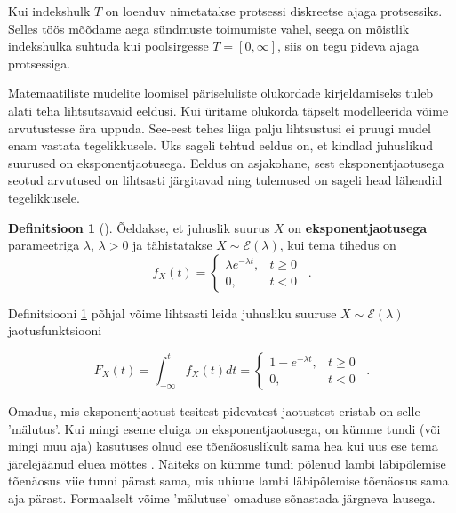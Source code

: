 \documentclass{article}
\theoremstyle{definition}
\newtheorem{definition}{Definitsioon}
\begin{document}
Kui indekshulk $T$ on loenduv nimetatakse protsessi diskreetse ajaga protsessiks. Selles töös mõõdame aega sündmuste toimumiste vahel, seega on mõistlik indekshulka suhtuda kui poolsirgesse $T= [0, \infty]$, siis on tegu pideva ajaga protsessiga.

Matemaatiliste mudelite loomisel päriseluliste olukordade kirjeldamiseks tuleb alati teha lihtsutsavaid eeldusi. Kui üritame olukorda täpselt modelleerida võime arvutustesse ära uppuda. See-eest tehes liiga palju lihtsustusi ei pruugi mudel enam vastata tegelikkusele. Üks sageli tehtud eeldus on, et kindlad juhuslikud suurused on eksponentjaotusega. Eeldus on asjakohane, sest eksponentjaotusega seotud arvutused on lihtsasti järgitavad ning tulemused on sageli head lähendid tegelikkusele. \cite[lk 291]{introduction-to-probability-models}

\begin{definition}[\cite{tõenäosusteooria-algkursus}]
    \label{def:eksponentjaotus}
    Õeldakse, et juhuslik suurus $X$ on \textbf{eksponentjaotusega} parameetriga $\lambda$, $\lambda > 0$ ja tähistatakse $X \sim \mathcal{E}(\lambda)$, kui tema tihedus on
    \begin{equation*}
        f_X(t) = 
        \begin{cases}
            \lambda e^{- \lambda t} ,   &t \geq 0 \\
            0 ,                         &t < 0
        \end{cases}
        \enspace .
    \end{equation*}
\end{definition}

Definitsiooni \ref{def:eksponentjaotus} põhjal võime lihtsasti leida juhusliku suuruse $X \sim \mathcal{E}(\lambda)$ jaotusfunktsiooni

\begin{equation*}
    F_X(t) = \int_{- \infty}^{t} f_X(t) dt = 
    \begin{cases}
        1 - e^{- \lambda t} ,   &t \geq 0 \\
        0 ,                     &t < 0
    \end{cases}
    \enspace .
\end{equation*}

Omadus, mis eksponentjaotust tesitest pidevatest jaotustest eristab on selle 'mälutus'. Kui mingi eseme eluiga on eksponentjaotusega, on kümme tundi (või mingi muu aja) kasutuses olnud ese tõenäosuslikult sama hea kui uus ese tema järelejäänud eluea mõttes \cite[lk 291]{introduction-to-probability-models}. Näiteks on kümme tundi põlenud lambi läbipõlemise tõenäosus viie tunni pärast sama, mis uhiuue lambi läbipõlemise tõenäosus sama aja pärast. Formaalselt võime 'mälutuse' omaduse sõnastada järgneva lausega.
\end{document}
